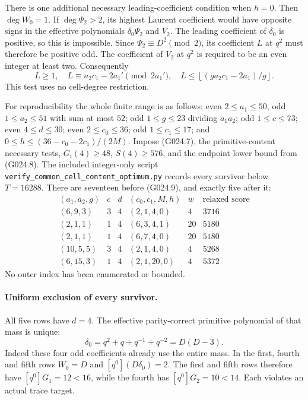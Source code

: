 There is one additional necessary leading-coefficient
condition when $h=0$. Then $\deg W_0=1$. If $\deg\Psi_2>2$,
its highest Laurent coefficient would have opposite signs
in the effective polynomials $\delta_0\Psi_2$ and $V_2$.
The leading coefficient of $\delta_0$ is positive, so this
is impossible. Since $\Psi_2\equiv D^2\pmod2$, its
coefficient $L$ at $q^2$ must therefore be positive odd.
The coefficient of $V_2$ at $q^2$ is required to be an
even integer at least two. Consequently
\[
 L\ge1,\quad L\equiv a_2c_1-2a_1'\pmod{2a_1'},\quad
 L\le\left\lfloor(g a_2c_1-2a_1)/g\right\rfloor.
 \tag{G024.9}
\]
This test uses no cell-degree restriction.

For reproducibility the whole finite range is as follows:
even $2\le a_1\le50$, odd $1\le a_2\le51$ with sum
at most $52$; odd $1\le g\le23$ dividing $a_1a_2$;
odd $1\le c\le73$; even $4\le d\le30$;
even $2\le c_0\le36$; odd $1\le c_1\le17$;
and $0\le h\le(36-c_0-2c_1)/(2M)$.
Impose (G024.7), the primitive-content necessary tests,
$G_i(4)\ge48$, $S(4)\ge576$, and the endpoint lower
bound from (G024.8). The included integer-only script
\texttt{verify\_common\_cell\_content\_optimum.py}
records every survivor below $T=16288$.
There are seventeen before (G024.9), and exactly five
after it:
\[
\begin{array}{c|c|c|c|c|r}
 (a_1,a_2,g)&c&d&(c_0,c_1,M,h)&w&\text{relaxed score}\\\hline
 (6,9,3)&3&4&(2,1,4,0)&4&3716\\
 (2,1,1)&1&4&(6,3,4,1)&20&5180\\
 (2,1,1)&1&4&(6,7,4,0)&20&5180\\
 (10,5,5)&3&4&(2,1,4,0)&4&5268\\
 (6,15,3)&1&4&(2,1,20,0)&4&5372
\end{array}                                                         \tag{G024.10}
\]
No outer index has been enumerated or bounded.

\paragraph{Uniform exclusion of every survivor.}
All five rows have $d=4$. The effective parity-correct
primitive polynomial of that mass is unique:
\[
 \delta_0=q^2+q+q^{-1}+q^{-2}=D(D-3).
\]
Indeed these four odd coefficients already use the entire
mass. In the first, fourth and fifth rows $W_0=D$ and
$[q^0](D\delta_0)=2$. The first and fifth rows therefore
have $[q^0]G_1=12<16$, while the fourth has
$[q^0]G_2=10<14$. Each violates an actual trace target.

